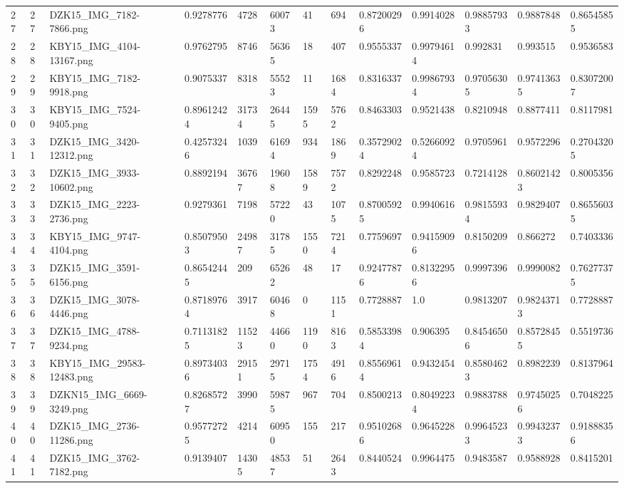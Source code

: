 \documentclass[11pt, a4paper, twoside]{report}
\begin{document}
\begin{longtable}[c]{@{}lllllllllllll@{}}
27 & 27 & DZK15\_IMG\_7182-7866.png & 0.9278776 & 4728 & 60073 & 41 & 694 & 0.87200296 & 0.9914028 & 0.98857933 & 0.9887848 & 0.86545855 \\
28 & 28 & KBY15\_IMG\_4104-13167.png & 0.9762795 & 8746 & 56365 & 18 & 407 & 0.9555337 & 0.99794614 & 0.992831 & 0.993515 & 0.9536583 \\
29 & 29 & KBY15\_IMG\_7182-9918.png & 0.9075337 & 8318 & 55523 & 11 & 1684 & 0.8316337 & 0.99867934 & 0.97056305 & 0.97413635 & 0.83072007 \\
30 & 30 & KBY15\_IMG\_7524-9405.png & 0.89612424 & 31734 & 26445 & 1595 & 5762 & 0.8463303 & 0.9521438 & 0.8210948 & 0.8877411 & 0.8117981 \\
31 & 31 & DZK15\_IMG\_3420-12312.png & 0.42573246 & 1039 & 61694 & 934 & 1869 & 0.35729024 & 0.52660924 & 0.9705961 & 0.9572296 & 0.27043205 \\
32 & 32 & DZK15\_IMG\_3933-10602.png & 0.8892194 & 36767 & 19608 & 1589 & 7572 & 0.8292248 & 0.9585723 & 0.7214128 & 0.86021423 & 0.8005356 \\
33 & 33 & DZK15\_IMG\_2223-2736.png & 0.9279361 & 7198 & 57220 & 43 & 1075 & 0.87005925 & 0.9940616 & 0.98155934 & 0.9829407 & 0.86556035 \\
34 & 34 & KBY15\_IMG\_9747-4104.png & 0.85079503 & 24987 & 31785 & 1550 & 7214 & 0.7759697 & 0.94159096 & 0.8150209 & 0.866272 & 0.7403336 \\
35 & 35 & DZK15\_IMG\_3591-6156.png & 0.86542445 & 209 & 65262 & 48 & 17 & 0.92477876 & 0.81322956 & 0.9997396 & 0.9990082 & 0.76277375 \\
36 & 36 & DZK15\_IMG\_3078-4446.png & 0.87189764 & 3917 & 60468 & 0 & 1151 & 0.7728887 & 1.0 & 0.9813207 & 0.98243713 & 0.7728887 \\
37 & 37 & DZK15\_IMG\_4788-9234.png & 0.71131825 & 11523 & 44660 & 1190 & 8163 & 0.58533984 & 0.906395 & 0.84546506 & 0.85728455 & 0.5519736 \\
38 & 38 & KBY15\_IMG\_29583-12483.png & 0.89734036 & 29151 & 29715 & 1754 & 4916 & 0.85569614 & 0.9432454 & 0.85804623 & 0.8982239 & 0.8137964 \\
39 & 39 & DZKN15\_IMG\_6669-3249.png & 0.82685727 & 3990 & 59875 & 967 & 704 & 0.8500213 & 0.80492234 & 0.9883788 & 0.97450256 & 0.7048225 \\
40 & 40 & DZK15\_IMG\_2736-11286.png & 0.95772725 & 4214 & 60950 & 155 & 217 & 0.95102686 & 0.9645228 & 0.99645233 & 0.99432373 & 0.91888356 \\
41 & 41 & DZK15\_IMG\_3762-7182.png & 0.9139407 & 14305 & 48537 & 51 & 2643 & 0.8440524 & 0.9964475 & 0.9483587 & 0.9588928 & 0.8415201 \\

\end{longtable}
\end{document}
